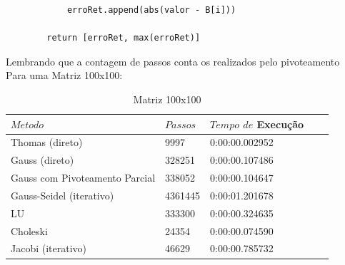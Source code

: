 \documentclass{article}
\begin{document}
\begin{itemize}
\begin{lstlisting}
            erroRet.append(abs(valor - B[i]))

        return [erroRet, max(erroRet)]
\end{lstlisting}

\newpage

\text Lembrando que a contagem de passos conta os realizados pelo pivoteamento\\
\text Para uma Matriz 100x100:

\begin{table}[h]
\centering
  \begin{tabular}{l||l|lll}
    $Metodo$ & $Passos$ & $Tempo$ $de$ Execução \\
    \hline
    Thomas (direto) & 9997 & 0:00:00.002952 \\
    
    Gauss (direto) & 328251 & 0:00:00.107486 \\
    
    Gauss com Pivoteamento Parcial & 338052 & 0:00:00.104647 \\
    
    Gauss-Seidel (iterativo) & 4361445 &  0:00:01.201678 \\
    
    LU & 333300  & 0:00:00.324635 \\
    
    Choleski & 24354 & 0:00:00.074590 \\
    
    Jacobi (iterativo) & 46629 & 0:00:00.785732 \\
    \hline
  \end{tabular}
  \caption{Matriz 100x100}
\end{table}



\end{itemize}
\end{document}
